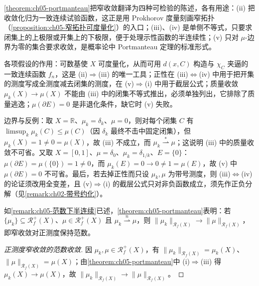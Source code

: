 \documentclass[../../main.tex]{subfiles}%
\begin{document}
\begin{remark}\label{remark:ch05-portmanteau动机}
\cref{theorem:ch05-portmanteau}把窄收敛翻译为四种可检验的陈述，各有用途：(ii) 把收敛化归为一致连续试验函数，这正是用 Prokhorov 度量刻画窄拓扑（\cref{proposition:ch05-窄拓扑可度量化}）的入口；(iii)、(iv) 是单侧不等式，只要求闭集上的上极限或开集上的下极限，便于处理示性函数的半连续性；(v) 只对 $\mu$-边界为零的集合要求收敛，是概率论中 Portmanteau 定理的标准形式。

各项假设的作用：可数基使 $X$ 可度量化，从而可用 $d(x,C)$ 构造与 $\chi_C$ 夹逼的一致连续函数 $f_n$，这是 (ii)$\Rightarrow$(iii) 的唯一工具；正性在 (iii)$\Leftrightarrow$(iv) 中用于把开集的测度写成全测度减去闭集的测度，在 (v)$\Rightarrow$(i) 中用于截层公式；质量收敛 $\mu_k(X)\to\mu(X)$ 不能由 (iii) 中的闭集不等式推出，必须单独列出，它排除了质量逃逸；$\mu(\partial E)=0$ 是非退化条件，缺它时 (v) 失败。

边界与反例：取 $X=\mathbb{R}$、$\mu_k=\delta_k$、$\mu=0$，则对每个闭集 $C$ 有 $\limsup_k\mu_k(C)\leqslant\mu(C)$（因 $\delta_k$ 最终不击中固定闭集），但 $\mu_k(X)=1\neq0=\mu(X)$，故 (iii) 不成立，而 $\mu_k\stackrel{*}{\rightharpoonup}\mu$；这说明 (iii) 中的质量收敛不可省。又取 $X=[0,1]$、$\mu=\delta_0$、$\mu_k=\delta_{1/k}$、$E=\{0\}$：$\mu(\partial E)=\mu(\{0\})=1\neq0$，而 $\mu_k(E)=0\to0\neq1=\mu(E)$，故 (v) 中 $\mu(\partial E)=0$ 不可省。最后，若去掉正性而只设 $\mu_k,\mu$ 为带号测度，则 (iii)$\Leftrightarrow$(iv) 的论证须改用全变差，且 (v)$\Rightarrow$(i) 的截层公式只对非负函数成立，须先作正负分解（见\cref{remark:ch02-带号约化}）。
\end{remark}

\begin{remark}\label{remark:ch05-窄收敛范数}
如\cref{remark:ch05-范数下半连续}已述，\cref{theorem:ch05-portmanteau}表明：若 $\{\mu_k\}\subseteq\mathscr{R}^+_f(X)$、$\mu\in\mathscr{R}^+_f(X)$ 且 $\mu_k\stackrel{n}{\rightharpoonup}\mu$，则 $\|\mu_k\|_{\mathscr{R}_f(X)}\to\|\mu\|_{\mathscr{R}_f(X)}$，即窄收敛对正测度保持范数。
\end{remark}

\begin{proof}[正测度窄收敛的范数收敛]
因 $\mu_k,\mu\in\mathscr{R}^+_f(X)$，有 $\|\mu_k\|_{\mathscr{R}_f(X)}=\mu_k(X)$、$\|\mu\|_{\mathscr{R}_f(X)}=\mu(X)$；由\cref{theorem:ch05-portmanteau}中 (i)$\Rightarrow$(iii) 得 $\mu_k(X)\to\mu(X)$，故 $\|\mu_k\|_{\mathscr{R}_f(X)}\to\|\mu\|_{\mathscr{R}_f(X)}$。
\end{proof}
\end{document}
